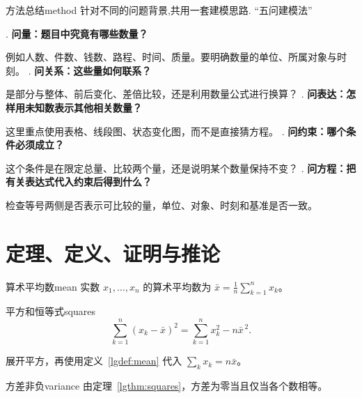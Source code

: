 \documentclass[UTF8,fontset=none,12pt,oneside]{ctexbook}
\begin{document}
\setcounter{chapter}{3}
\setcounter{section}{4}
\noindent
\begin{lgproposition}{方法总结}{method}
   针对不同的问题背景,共用一套建模思路. ``五问建模法''
   \begin{lgtimeline}
      . \textbf{问量：题目中究竟有哪些数量？}
   
   例如人数、件数、钱数、路程、时间、质量。要明确数量的单位、所属对象与时刻。
      . \textbf{问关系：这些量如何联系？}
   
   是部分与整体、前后变化、差倍比较，还是利用数量公式进行换算？
      . \textbf{问表达：怎样用未知数表示其他相关数量？}
   
   这里重点使用表格、线段图、状态变化图，而不是直接猜方程。
      . \textbf{问约束：哪个条件必须成立？}
   
   这个条件是在限定总量、比较两个量，还是说明某个数量保持不变？
      . \textbf{问方程：把有关表达式代入约束后得到什么？}
   
   检查等号两侧是否表示可比较的量，单位、对象、时刻和基准是否一致。
   \end{lgtimeline}
\end{lgproposition}

\clearpage
\section*{定理、定义、证明与推论}
\begin{lgdefinition}{算术平均数}{mean}
实数 $x_1,\ldots,x_n$ 的算术平均数为
$\bar{x}=\frac1n\sum_{k=1}^n x_k$。
\end{lgdefinition}

\begin{lgtheorem}{平方和恒等式}{squares}
\[\sum_{k=1}^n(x_k-\bar{x})^2=\sum_{k=1}^n x_k^2-n\bar{x}^{\,2}.\]
\end{lgtheorem}

\begin{lgproof}
展开平方，再使用定义~\ref{lgdef:mean} 代入 $\sum_k x_k=n\bar{x}$。
\end{lgproof}

\begin{lgcorollary}{方差非负}{variance}
由定理~\ref{lgthm:squares}，方差为零当且仅当各个数相等。
\end{lgcorollary}

\clearpage
\end{document}

